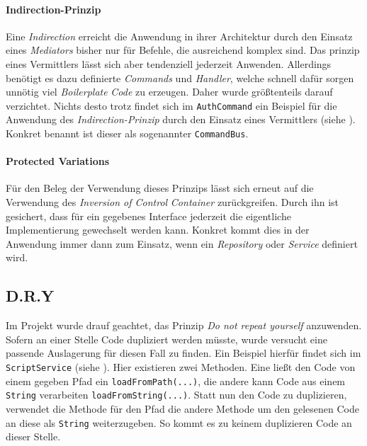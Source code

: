     \label{lst:module}
\egroup

\paragraph{Indirection-Prinzip}

Eine \emph{Indirection} erreicht die Anwendung in ihrer Architektur durch den Einsatz eines \emph{Mediators} bisher nur für Befehle, die ausreichend komplex sind.
Das prinzip eines Vermittlers lässt sich aber tendenziell jederzeit Anwenden.
Allerdings benötigt es dazu definierte \emph{Commands} und \emph{Handler}, welche schnell dafür sorgen unnötig viel \emph{Boilerplate} \emph{Code} zu erzeugen.
Daher wurde größtenteils darauf verzichtet.
Nichts desto trotz findet sich im \texttt{AuthCommand} ein Beispiel für die Anwendung des \emph{Indirection-Prinzip} durch den Einsatz eines Vermittlers (siehe ).
Konkret benannt ist dieser als sogenannter \texttt{CommandBus}.

\bgroup

    \label{lst:auth_command}
\egroup

\paragraph{Protected Variations}

Für den Beleg der Verwendung dieses Prinzips lässt sich erneut auf die Verwendung des \emph{Inversion of Control} \emph{Container} zurückgreifen.
Durch ihn ist gesichert, dass für ein gegebenes Interface jederzeit die eigentliche Implementierung gewechselt werden kann.
Konkret kommt dies in der Anwendung immer dann zum Einsatz, wenn ein \emph{Repository} oder \emph{Service} definiert wird.

\subsection{D.R.Y}
\label{subsec:dry}

Im Projekt wurde drauf geachtet, das Prinzip \emph{Do not repeat yourself} anzuwenden.
Sofern an einer Stelle Code dupliziert werden müsste, wurde versucht eine passende Auslagerung für diesen Fall zu finden.
Ein Beispiel hierfür findet sich im \texttt{ScriptService} (siehe ).
Hier existieren zwei Methoden.
Eine ließt den Code von einem gegeben Pfad ein \texttt{loadFromPath(...)}, die andere kann Code aus einem \texttt{String} verarbeiten \texttt{loadFromString(...)}.
Statt nun den Code zu duplizieren, verwendet die Methode für den Pfad die andere Methode um den gelesenen Code an diese als \texttt{String} weiterzugeben.
So kommt es zu keinem duplizieren Code an dieser Stelle.
